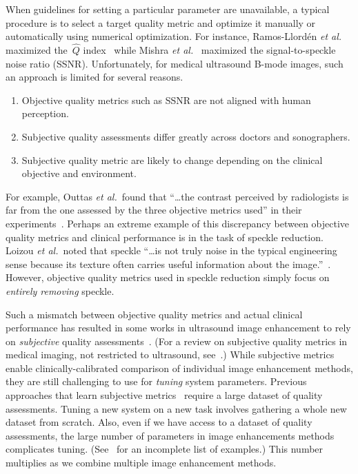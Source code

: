 When guidelines for setting a particular parameter are unavailable, a typical procedure is to select a target quality metric and optimize it manually or automatically using numerical optimization.
For instance, Ramos-Llord\'en \textit{et al.}~\cite{ramos-llorden_anisotropic_2015} maximized the~\(\widehat{Q}\) index~\cite{tay_ultrasound_2006} while Mishra \textit{et al.}~\cite{mishra_edge_2018} maximized the signal-to-speckle noise ratio (SSNR).
Unfortunately, for medical ultrasound B-mode images, such an approach is limited for several reasons.
\vspace{0.05in}
\begin{enumerate}
  \item[\ding{228}] Objective quality metrics such as SSNR are not aligned with human perception.
    \vspace{0.05in}
  \item[\ding{228}] Subjective quality assessments differ greatly across doctors and sonographers.
    \vspace{0.05in}
  \item[\ding{228}] Subjective quality metric are likely to change depending on the clinical objective and environment.
\end{enumerate}
For example, Outtas \textit{et al.}~found that ``\ldots the contrast perceived by radiologists is far from the one assessed by the three objective metrics used'' in their experiments~\cite{outtas_subjective_2018}.
Perhaps an extreme example of this discrepancy between objective quality metrics and clinical performance is in the task of speckle reduction.
Loizou \textit{et al.}~noted that speckle ``\ldots is not truly noise in the typical engineering sense because its texture often carries useful information about the image.''~\cite{loizou_comparative_2005}.
However, objective quality metrics used in speckle reduction simply focus on \textit{entirely removing} speckle.

Such a mismatch between objective quality metrics and actual clinical performance has resulted in some works in ultrasound image enhancement to rely on \textit{subjective} quality assessments~\cite{loizou_quality_2006, hemmsen_ultrasound_2010, wong_monte_2012, kang_new_2016, mishra_edge_2018}.
(For a review on subjective quality metrics in medical imaging, not restricted to ultrasound, see~\cite{chow_review_2016}.)
While subjective metrics enable clinically-calibrated comparison of individual image enhancement methods, they are still challenging to use for \textit{tuning} system parameters.
Previous approaches that learn subjective metrics~\cite{el-zehiry_learning_2013, abdi_automatic_2017, annangi_ai_2020} require a large dataset of quality assessments.
Tuning a new system on a new task involves gathering a whole new dataset from scratch.
Also, even if we have access to a dataset of quality assessments, the large number of parameters in image enhancements methods complicates tuning.
(See~\cite[Table 5]{finn_echocardiographic_2011} for an incomplete list of examples.)
This number multiplies as we combine multiple image enhancement methods.


